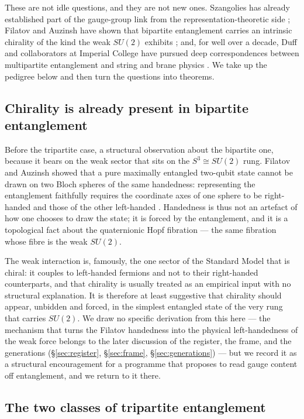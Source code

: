 These are not idle questions, and they are not new ones. Szangolies has already established part of
the gauge-group link from the representation-theoretic side \autocite{szangolies2025standardmodel};
Filatov and Auzinsh have shown that bipartite entanglement carries an intrinsic chirality of the
kind the weak $SU(2)$ exhibits \autocite{filatov2024towards}; and, for well over a decade, Duff and
collaborators at Imperial College have pursued deep correspondences between multipartite
entanglement and string and brane physics \autocite{duff2007string,borsten2009blackholes}. We take
up the pedigree below and then turn the questions into theorems.

\subsection{Chirality is already present in bipartite entanglement}

Before the tripartite case, a structural observation about the bipartite one, because it bears on
the weak sector that sits on the $S^3 \cong SU(2)$ rung. Filatov and Auzinsh showed that a pure
maximally entangled two-qubit state cannot be drawn on two Bloch spheres of the same handedness:
representing the entanglement faithfully requires the coordinate axes of one sphere to be
right-handed and those of the other left-handed \autocite{filatov2024towards}. Handedness is thus
not an artefact of how one chooses to draw the state; it is forced by the entanglement, and it is a
topological fact about the quaternionic Hopf fibration --- the same fibration whose fibre is the weak
$SU(2)$.

The weak interaction is, famously, the one sector of the Standard Model that is chiral: it couples
to left-handed fermions and not to their right-handed counterparts, and that chirality is usually
treated as an empirical input with no structural explanation. It is therefore at least suggestive
that chirality should appear, unbidden and forced, in the simplest entangled state of the very rung
that carries $SU(2)$. We draw no specific derivation from this here --- the mechanism that turns the
Filatov handedness into the physical left-handedness of the weak force belongs to the later
discussion of the register, the frame, and the generations (\S\ref{sec:register},
\S\ref{sec:frame}, \S\ref{sec:generations}) --- but we record it as a structural encouragement
for a programme that proposes to read gauge content off entanglement, and we return to it there.

\subsection{The two classes of tripartite entanglement}

